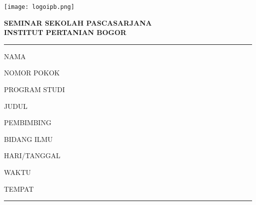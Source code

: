 
\thispagestyle{empty}
\begin{titlepage}
   \centering %
   {\texttt{[image: logoipb.png]} \par}

   \vspace{5mm}
   {\large \bf SEMINAR SEKOLAH PASCASARJANA \\
   INSTITUT PERTANIAN BOGOR \par }

   \vspace{5mm}
   \rule{15cm}{1.0pt}
   \begin{flushleft}
      NAMA \tab{: \NAMA}

      \vspace{3mm}
      NOMOR POKOK \tab{: \NRP}

      \vspace{3mm}
      PROGRAM STUDI \tab{: \PROGRAMSTUDI}

      \vspace{3mm}
      JUDUL \tab{: \JUDULBARISSATU}

            \tab{~~\JUDULBARISDUA}

            \tab{~~\JUDULBARISTIGA}

      \vspace{3mm}
      PEMBIMBING 


      \vspace{3mm}
      BIDANG ILMU \tab{: \BIDANGILMU}

      \vspace{3mm}
      HARI/TANGGAL \tab{: \HARI, \TANGGAL}

      \vspace{3mm}
      WAKTU \tab{: \WAKTU}

      \vspace{3mm}
      TEMPAT \tab{:~\TEMPATBARISSATU}

             \tab{~~\TEMPATBARISDUA}

   \end{flushleft}
   \rule{15cm}{1.5pt}
\end{titlepage}
